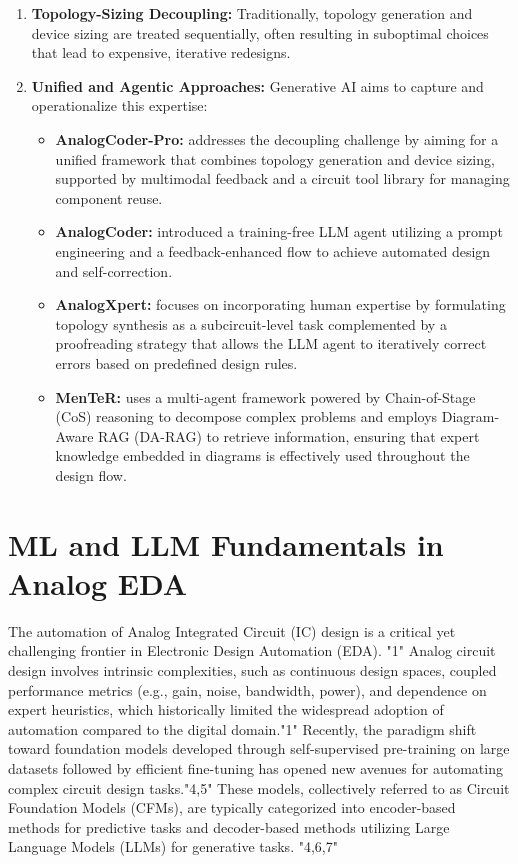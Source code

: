 \documentclass{ieeeaccess}
\begin{document}
\begin{enumerate}
	\item \textbf{Topology-Sizing Decoupling:} Traditionally, topology generation and device sizing are treated sequentially, often resulting in suboptimal choices that lead to expensive, iterative redesigns.
	\item \textbf{Unified and Agentic Approaches:} Generative AI aims to capture and operationalize this expertise:
	      \begin{itemize}
		      \item \textbf{AnalogCoder-Pro:} addresses the decoupling challenge by aiming for a unified framework that combines topology generation and device sizing, supported by multimodal feedback and a circuit tool library for managing component reuse.
		      \item \textbf{AnalogCoder:} introduced a training-free LLM agent utilizing a prompt engineering and a feedback-enhanced flow to achieve automated design and self-correction.
		      \item \textbf{AnalogXpert:} focuses on incorporating human expertise by formulating topology synthesis as a subcircuit-level task complemented by a proofreading strategy that allows the LLM agent to iteratively correct errors based on predefined design rules.
		      \item \textbf{MenTeR:} uses a multi-agent framework powered by Chain-of-Stage (CoS) reasoning to decompose complex problems and employs Diagram-Aware RAG (DA-RAG) to retrieve information, ensuring that expert knowledge embedded in diagrams is effectively used throughout the design flow.
	      \end{itemize}
\end{enumerate}

\section{ML and LLM Fundamentals in Analog EDA} %
The automation of Analog Integrated Circuit (IC) design is a critical yet challenging frontier in Electronic Design Automation (EDA). "1" Analog circuit design involves intrinsic complexities, such as continuous design spaces, coupled performance metrics (e.g., gain, noise, bandwidth, power), and dependence on expert heuristics, which historically limited the widespread adoption of automation compared to the digital domain."1"
\newline
Recently, the paradigm shift toward foundation models developed through self-supervised pre-training on large datasets followed by efficient fine-tuning has opened new avenues for automating complex circuit design tasks."4,5"
These models, collectively referred to as Circuit Foundation Models (CFMs), are typically categorized into encoder-based methods for predictive tasks and decoder-based methods utilizing Large Language Models (LLMs) for generative tasks. "4,6,7"
\end{document}
